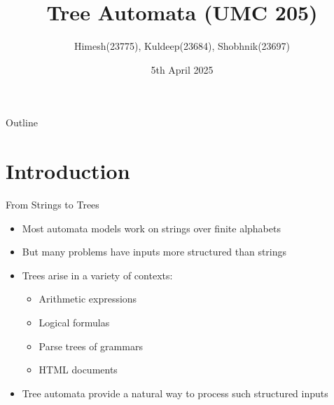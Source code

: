 \documentclass[10pt,svgnames,fragile]{beamer}
\title{Tree Automata (UMC 205)}
\author{Himesh(23775), Kuldeep(23684), Shobhnik(23697) }
\date{5th April 2025}
\begin{document}
\begin{frame}
  \titlepage
\end{frame}

\begin{frame}{Outline}
  \tableofcontents
\end{frame}

\section{Introduction}

\begin{frame}{From Strings to Trees}
  \begin{itemize}
    \item Most automata models work on strings over finite alphabets
    \item But many problems have inputs more structured than strings
    \item Trees arise in a variety of contexts:
      \begin{itemize}
        \item Arithmetic expressions
        \item Logical formulas
        \item Parse trees of grammars
        \item HTML documents
      \end{itemize}
    \item Tree automata provide a natural way to process such structured inputs
  \end{itemize}
\end{frame}
\end{document}
